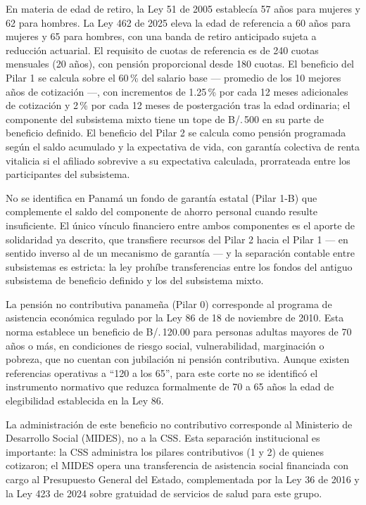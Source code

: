 \documentclass[12pt, letterpaper]{article}
\begin{document}
En materia de edad de retiro, la Ley 51 de 2005 establecía 57 años para mujeres y 62 para hombres. La Ley 462 de 2025 eleva la edad de referencia a 60 años para mujeres y 65 para hombres, con una banda de retiro anticipado sujeta a reducción actuarial. El requisito de cuotas de referencia es de 240 cuotas mensuales (20 años), con pensión proporcional desde 180 cuotas. El beneficio del Pilar 1 se calcula sobre el 60\,\% del salario base --- promedio de los 10 mejores años de cotización ---, con incrementos de 1.25\,\% por cada 12 meses adicionales de cotización y 2\,\% por cada 12 meses de postergación tras la edad ordinaria; el componente del subsistema mixto tiene un tope de B/.\,500 en su parte de beneficio definido. El beneficio del Pilar 2 se calcula como pensión programada según el saldo acumulado y la expectativa de vida, con garantía colectiva de renta vitalicia si el afiliado sobrevive a su expectativa calculada, prorrateada entre los participantes del subsistema.

No se identifica en Panamá un fondo de garantía estatal (Pilar 1-B) que complemente el saldo del componente de ahorro personal cuando resulte insuficiente. El único vínculo financiero entre ambos componentes es el aporte de solidaridad ya descrito, que transfiere recursos del Pilar 2 hacia el Pilar 1 --- en sentido inverso al de un mecanismo de garantía --- y la separación contable entre subsistemas es estricta: la ley prohíbe transferencias entre los fondos del antiguo subsistema de beneficio definido y los del subsistema mixto.

La pensión no contributiva panameña (Pilar 0) corresponde al programa de asistencia económica regulado por la Ley 86 de 18 de noviembre de 2010. Esta norma establece un beneficio de B/.\,120.00 para personas adultas mayores de 70 años o más, en condiciones de riesgo social, vulnerabilidad, marginación o pobreza, que no cuentan con jubilación ni pensión contributiva. Aunque existen referencias operativas a ``120 a los 65'', para este corte no se identificó el instrumento normativo que reduzca formalmente de 70 a 65 años la edad de elegibilidad establecida en la Ley 86.

La administración de este beneficio no contributivo corresponde al Ministerio de Desarrollo Social (MIDES), no a la CSS. Esta separación institucional es importante: la CSS administra los pilares contributivos (1 y 2) de quienes cotizaron; el MIDES opera una transferencia de asistencia social financiada con cargo al Presupuesto General del Estado, complementada por la Ley 36 de 2016 y la Ley 423 de 2024 sobre gratuidad de servicios de salud para este grupo.
\end{document}
